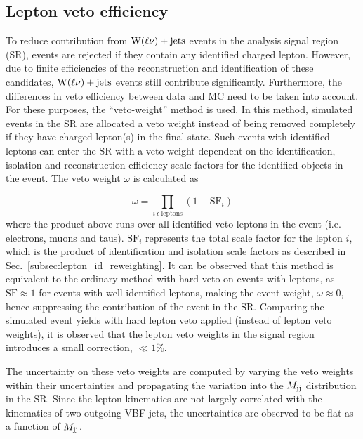 \clearpage

\subsection{Lepton veto efficiency}
\label{subsec:veto_weight_reweighting}

To reduce contribution from $\textrm{W}(\ell\nu)+\textrm{jets}$ events in the analysis signal region (SR), 
events are rejected if they contain any
identified charged lepton. However, due to finite efficiencies of the
reconstruction and identification of these candidates, $\textrm{W}(\ell\nu)+\textrm{jets}$
events still contribute significantly. Furthermore, the differences in veto efficiency between data and MC
need to be taken into account. For these purposes, the ``veto-weight'' method is used.
In this method, simulated events in the SR are allocated a veto weight instead of
being removed completely if they have charged lepton(s) in the final state. Such events with
identified leptons can enter the SR with a veto weight dependent on the identification, isolation and reconstruction 
efficiency scale factors for the identified objects
in the event. The veto weight $\omega$ is calculated as

\begin{equation}
    \omega = \prod_{i \ \epsilon \ \textrm{leptons}} (1-\textrm{SF}_{i}) 
\end{equation}
where the product above runs over all identified veto leptons in the event (i.e. electrons, muons and taus).
$\textrm{SF}_{i}$ represents the total scale factor for the lepton $i$, which is the product of identification and isolation
scale factors as described in Sec.~\ref{subsec:lepton_id_reweighting}. It can be observed that this method is equivalent
to the ordinary method with hard-veto on events with leptons, as $\textrm{SF} \approx 1$ for events with well identified leptons,
making the event weight, $\omega \approx 0$, hence suppressing the contribution of the event in the SR.
Comparing the simulated event yields with hard
lepton veto applied (instead of lepton veto weights), it is observed that the lepton veto weights in the signal region
introduces a small correction, $\ll 1\%$.

The uncertainty on these veto weights are computed by varying the veto weights within their uncertainties and
propagating the variation into the $M_{\textrm{jj}}$ distribution in the SR. Since the lepton kinematics are not largely
correlated with the kinematics of two outgoing VBF jets, the uncertainties are observed to be flat as a function
of $M_{\textrm{jj}}$.

